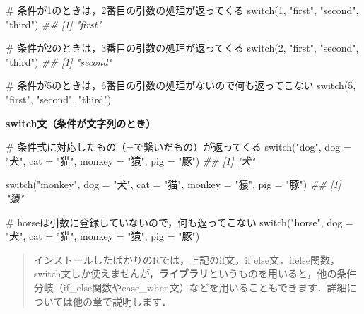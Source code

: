 \documentclass[
  letterpaper,
  DIV=11,
  numbers=noendperiod]{scrreprt}
\newenvironment{Shaded}{\begin{snugshade}}{\end{snugshade}}
\newcommand{\AttributeTok}[1]{\textcolor[rgb]{0.40,0.45,0.13}{#1}}
\newcommand{\CommentTok}[1]{\textcolor[rgb]{0.37,0.37,0.37}{#1}}
\newcommand{\ControlFlowTok}[1]{\textcolor[rgb]{0.00,0.23,0.31}{#1}}
\newcommand{\DecValTok}[1]{\textcolor[rgb]{0.68,0.00,0.00}{#1}}
\newcommand{\DocumentationTok}[1]{\textcolor[rgb]{0.37,0.37,0.37}{\textit{#1}}}
\newcommand{\NormalTok}[1]{\textcolor[rgb]{0.00,0.23,0.31}{#1}}
\newcommand{\StringTok}[1]{\textcolor[rgb]{0.13,0.47,0.30}{#1}}
\begin{document}
\begin{Shaded}
\begin{Highlighting}[]
\CommentTok{\# 条件が1のときは，2番目の引数の処理が返ってくる}
\ControlFlowTok{switch}\NormalTok{(}\DecValTok{1}\NormalTok{, }\StringTok{"first"}\NormalTok{, }\StringTok{"second"}\NormalTok{, }\StringTok{"third"}\NormalTok{) }
\DocumentationTok{\#\# [1] "first"}

\CommentTok{\# 条件が2のときは，3番目の引数の処理が返ってくる}
\ControlFlowTok{switch}\NormalTok{(}\DecValTok{2}\NormalTok{, }\StringTok{"first"}\NormalTok{, }\StringTok{"second"}\NormalTok{, }\StringTok{"third"}\NormalTok{) }
\DocumentationTok{\#\# [1] "second"}

\CommentTok{\# 条件が5のときは，6番目の引数の処理がないので何も返ってこない}
\ControlFlowTok{switch}\NormalTok{(}\DecValTok{5}\NormalTok{, }\StringTok{"first"}\NormalTok{, }\StringTok{"second"}\NormalTok{, }\StringTok{"third"}\NormalTok{) }
\end{Highlighting}
\end{Shaded}

\textbf{switch文（条件が文字列のとき）}

\begin{Shaded}
\begin{Highlighting}[]
\CommentTok{\# 条件式に対応したもの（=で繋いだもの）が返ってくる}
\ControlFlowTok{switch}\NormalTok{(}\StringTok{"dog"}\NormalTok{, }\AttributeTok{dog =} \StringTok{"犬"}\NormalTok{, }\AttributeTok{cat =} \StringTok{"猫"}\NormalTok{, }\AttributeTok{monkey =} \StringTok{"猿"}\NormalTok{, }\AttributeTok{pig =} \StringTok{"豚"}\NormalTok{)}
\DocumentationTok{\#\# [1] "犬"}

\ControlFlowTok{switch}\NormalTok{(}\StringTok{"monkey"}\NormalTok{, }\AttributeTok{dog =} \StringTok{"犬"}\NormalTok{, }\AttributeTok{cat =} \StringTok{"猫"}\NormalTok{, }\AttributeTok{monkey =} \StringTok{"猿"}\NormalTok{, }\AttributeTok{pig =} \StringTok{"豚"}\NormalTok{)}
\DocumentationTok{\#\# [1] "猿"}

\CommentTok{\# horseは引数に登録していないので，何も返ってこない}
\ControlFlowTok{switch}\NormalTok{(}\StringTok{"horse"}\NormalTok{, }\AttributeTok{dog =} \StringTok{"犬"}\NormalTok{, }\AttributeTok{cat =} \StringTok{"猫"}\NormalTok{, }\AttributeTok{monkey =} \StringTok{"猿"}\NormalTok{, }\AttributeTok{pig =} \StringTok{"豚"}\NormalTok{)}
\end{Highlighting}
\end{Shaded}

\begin{quote}
インストールしたばかりのRでは，上記のif文，if
else文，ifelse関数，switch文しか使えませんが，\textbf{ライブラリ}というものを用いると，他の条件分岐（if\_else関数やcase\_when文）などを用いることもできます．詳細については他の章で説明します．
\end{quote}
\end{document}
